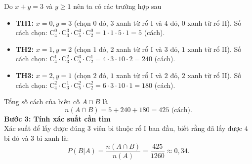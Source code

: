 \begin{ex}
{\begin{itemize}
		\end{itemize}
		Do $x+y=3$ và $y \ge 1$ nên ta có các trường hợp sau
		\begin{itemize}
			\item \textbf{TH1:} $x=0, y=3$ (chọn $0$ đỏ, $3$ xanh từ rổ I và $4$ đỏ, $0$ xanh từ rổ II).
			Số cách chọn: $\mathrm{C}_{4}^0 \cdot \mathrm{C}_{3}^3 \cdot \mathrm{C}_{5}^4 \cdot \mathrm{C}_{2}^0 = 1 \cdot 1 \cdot 5 \cdot 1 = 5$ (cách).
			\item \textbf{TH2:} $x=1, y=2$ (chọn $1$ đỏ, $2$ xanh từ rổ I và $3$ đỏ, $1$ xanh từ rổ II).
			Số cách chọn: $\mathrm{C}_{4}^1 \cdot \mathrm{C}_{3}^2 \cdot \mathrm{C}_{5}^3 \cdot \mathrm{C}_{2}^1 = 4 \cdot 3 \cdot 10 \cdot 2 = 240$ (cách).
			\item \textbf{TH3:} $x=2, y=1$ (chọn $2$ đỏ, $1$ xanh từ rổ I và $2$ đỏ, $2$ xanh từ rổ II).
			Số cách chọn: $\mathrm{C}_{4}^2 \cdot \mathrm{C}_{3}^1 \cdot \mathrm{C}_{5}^2 \cdot \mathrm{C}_{2}^2 = 6 \cdot 3 \cdot 10 \cdot 1 = 180$ (cách).
		\end{itemize}
		Tổng số cách của biến cố $A \cap B$ là
		$$n(A \cap B) = 5 + 240 + 180 = 425 \text{ (cách)}.$$
		\textbf{Bước 3: Tính xác suất cần tìm}\\
		Xác suất để lấy được đúng $3$ viên bi thuộc rổ I ban đầu, biết rằng đã lấy được $4$ bi đỏ và $3$ bi xanh là:
		$$P(B|A) = \dfrac{n(A \cap B)}{n(A)} = \dfrac{425}{1260} \approx 0,34.$$
	}
\end{ex}